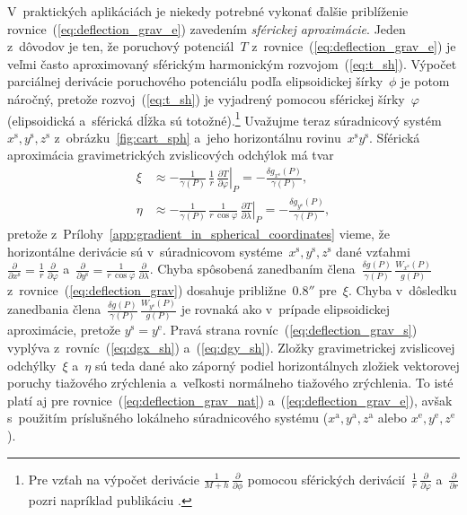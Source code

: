 \documentclass[a4paper, 12pt]{book}
\begin{document}
V~praktických aplikáciách je niekedy potrebné vykonať ďalšie priblíženie 
rovnice~(\ref{eq:deflection_grav_e}) zavedením \emph{sférickej aproximácie}.  
Jeden z~dôvodov je ten, že poruchový potenciál~$T$ 
z~rovnice~(\ref{eq:deflection_grav_e}) je veľmi často aproximovaný sférickým 
harmonickým rozvojom~(\ref{eq:t_sh}).  Výpočet parciálnej derivácie poruchového 
potenciálu podľa elipsoidickej šírky~$\phi$ je potom náročný, pretože 
rozvoj~(\ref{eq:t_sh}) je vyjadrený pomocou sférickej šírky~$\varphi$ 
(elipsoidická a~sférická dĺžka sú totožné).\footnote{Pre vzťah na výpočet 
derivácie $\frac{1}{M + h} \, \frac{\partial}{\partial\phi}$ pomocou sférických 
derivácií~$\frac{1}{r} \, \frac{\partial}{\partial \varphi}$ 
a~$\frac{\partial}{\partial r}$ pozri napríklad publikáciu 
\textcite{Jekeli1999b}.}  Uvažujme teraz súradnicový systém~$x^\mathrm{s}, 
y^\mathrm{s}, z^\mathrm{s}$ z~obrázku~\ref{fig:cart_sph} a~jeho horizontálnu 
rovinu~$x^\mathrm{s}y^\mathrm{s}$.  Sférická aproximácia gravimetrických 
zvislicových odchýlok má tvar \parencite{Jekeli1999b}
%
\begin{equation}
\label{eq:deflection_grav_s}
\begin{split}
\xi &\approx -\frac{1}{\gamma(P)} \, \frac{1}{r} \, \left.\frac{\partial 
T}{\partial \varphi}\right|_P = -\frac{\delta 
g_{x^\mathrm{s}}(P)}{\gamma(P)}{,}\\
%
\eta &\approx -\frac{1}{\gamma(P)} \, \frac{1}{r \, \cos\varphi} \, 
\left.\frac{\partial T}{\partial \lambda}\right|_P = -\frac{\delta 
g_{y^\mathrm{s}}(P)}{\gamma(P)}{,}
\end{split}
\end{equation}
%
pretože z~Prílohy~\ref{app:gradient_in_spherical_coordinates} vieme, že 
horizontálne derivácie sú v~súradnicovom systéme~$x^\mathrm{s}, y^\mathrm{s}, 
z^\mathrm{s}$ dané vzťahmi~$\frac{\partial}{\partial x^\mathrm{s}} 
= \frac{1}{r} \, \frac{\partial}{\partial\varphi}$ a~$\frac{\partial}{\partial 
y^\mathrm{s}} = \frac{1}{r \, \cos\varphi} \, 
\frac{\partial}{\partial\lambda}$.  Chyba spôsobená zanedbaním 
člena~$\frac{\delta g(P)}{\gamma(P)} \, \frac{W_{x^\mathrm{s}}(P)}{g(P)}$ 
z~rovnice~(\ref{eq:deflection_grav}) dosahuje približne~$0.8''$ pre~$\xi$.  
Chyba v~dôsledku zanedbania člena~$\frac{\delta g(P)}{\gamma(P)} \, 
\frac{W_{y^\mathrm{s}}(P)}{g(P)}$ je rovnaká ako v~prípade elipsoidickej 
aproximácie, pretože $y^\mathrm{s} = y^\mathrm{e}$.  Pravá strana 
rovníc~(\ref{eq:deflection_grav_s}) vyplýva z~rovníc~(\ref{eq:dgx_sh}) 
a~(\ref{eq:dgy_sh}).  Zložky gravimetrickej zvislicovej odchýlky~$\xi$ a~$\eta$ 
sú teda dané ako záporný podiel horizontálnych zložiek vektorovej poruchy 
tiažového zrýchlenia a~veľkosti normálneho tiažového zrýchlenia. To isté platí 
aj pre rovnice~(\ref{eq:deflection_grav_nat}) a~(\ref{eq:deflection_grav_e}), 
avšak s~použitím príslušného lokálneho súradnicového systému ($x^\mathrm{a}, 
y^\mathrm{a}, z^\mathrm{a}$ alebo $x^\mathrm{e}, y^\mathrm{e}, z^\mathrm{e}$).
\end{document}

